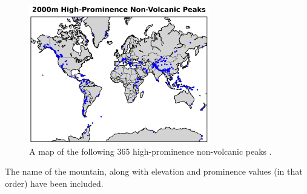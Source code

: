 \documentclass[10pt,twocolumn,letterpaper]{article}
\begin{document}
\begin{figure}[t]
\begin{center}
\includegraphics[width=0.7\textwidth]{peaks.png}
\end{center}
   \caption{A map of the following 365 high-prominence non-volcanic peaks \cite{62}.}
   \label{fig:22}
\end{figure}

The name of the mountain, along with elevation and prominence values (in that order) have been included.
\end{document}
